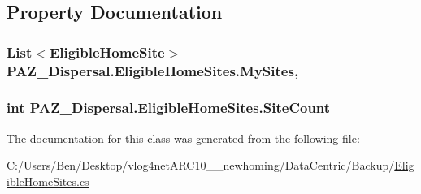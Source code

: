 \subsection{Property Documentation}
\hypertarget{class_p_a_z___dispersal_1_1_eligible_home_sites_ac6f08db713ff9674d7649f93849b947e}{
\subsubsection[{My\-Sites}]{\setlength{\rightskip}{0pt plus 5cm}List$<${\bf Eligible\-Home\-Site}$>$ P\-A\-Z\-\_\-\-Dispersal.\-Eligible\-Home\-Sites.\-My\-Sites\hspace{0.3cm}{\ttfamily [get]}, {\ttfamily [set]}}}\label{class_p_a_z___dispersal_1_1_eligible_home_sites_ac6f08db713ff9674d7649f93849b947e}
\hypertarget{class_p_a_z___dispersal_1_1_eligible_home_sites_ac5c6d0fad97a12eae158b82988c786bc}{
\subsubsection[{Site\-Count}]{\setlength{\rightskip}{0pt plus 5cm}int P\-A\-Z\-\_\-\-Dispersal.\-Eligible\-Home\-Sites.\-Site\-Count\hspace{0.3cm}{\ttfamily [get]}}}\label{class_p_a_z___dispersal_1_1_eligible_home_sites_ac5c6d0fad97a12eae158b82988c786bc}


The documentation for this class was generated from the following file\-:\begin{DoxyCompactItemize}
\item 
C\-:/\-Users/\-Ben/\-Desktop/vlog4net\-A\-R\-C10\-\_\-\_\-newhoming/\-Data\-Centric/\-Backup/\hyperlink{_backup_2_eligible_home_sites_8cs}{Eligible\-Home\-Sites.\-cs}\end{DoxyCompactItemize}
